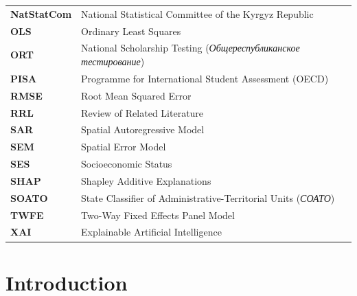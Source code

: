 \documentclass[12pt,letterpaper]{report}
\begin{document}
\begin{singlespace}
\begin{tabularx}{\textwidth}{l X}
\textbf{NatStatCom} & National Statistical Committee of the Kyrgyz Republic \\
\textbf{OLS} & Ordinary Least Squares \\
\textbf{ORT} & National Scholarship Testing (\textit{Общереспубликанское тестирование}) \\
\textbf{PISA} & Programme for International Student Assessment (OECD) \\
\textbf{RMSE} & Root Mean Squared Error \\
\textbf{RRL} & Review of Related Literature \\
\textbf{SAR} & Spatial Autoregressive Model \\
\textbf{SEM} & Spatial Error Model \\
\textbf{SES} & Socioeconomic Status \\
\textbf{SHAP} & Shapley Additive Explanations \\
\textbf{SOATO} & State Classifier of Administrative-Territorial Units (\textit{СОАТО}) \\
\textbf{TWFE} & Two-Way Fixed Effects Panel Model \\
\textbf{XAI} & Explainable Artificial Intelligence \\
\end{tabularx}
\end{singlespace}

\newpage

\pagestyle{mainbody}
\setcounter{page}{1}

\chapter{Introduction}
\label{chap:intro}
\end{document}

